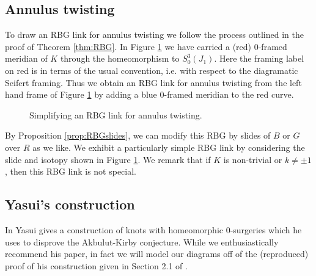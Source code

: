 \documentclass [11pt]{amsart}
\theoremstyle{remark}
\begin{document}
\subsection{Annulus twisting}
\label{sec:annulusRBG}

To draw an RBG link for annulus twisting we follow the process outlined in the proof of Theorem \ref{thm:RBG}. In Figure \ref{fig:rbgforannulus} we have carried a (red) 0-framed meridian of $K$  through the homeomorphism to $S^3_0(J_1)$. Here the framing label on red is in terms of the usual convention, i.e. with respect to the diagramatic Seifert framing. Thus we obtain an RBG link for annulus twisting from the left hand frame of Figure \ref{fig:rbgforannulus} by adding a blue 0-framed meridian to the red curve.

\begin{figure}
{
   \fontsize{9pt}{11pt}\selectfont
   \def\svgwidth{7in}
   
   \vspace*{-5mm}
}
\caption{Simplifying an RBG link for annulus twisting.}
\label{fig:rbgforannulus}
\end{figure}


By Proposition \ref{prop:RBGslides}, we can modify this RBG by slides of $B$ or $G$ over $R$ as we like.  We exhibit a particularly simple RBG link by considering the slide and isotopy shown in Figure \ref{fig:rbgforannulus}. We remark that if $K$ is non-trivial or $k\neq\pm 1$, then this RBG link is not special. 

\subsection{Yasui's construction}\label{sec:Yasui}
In \cite{Yasui} Yasui gives a construction of knots with homeomorphic 0-surgeries which he uses to disprove the Akbulut-Kirby conjecture. While we enthusiastically recommend his paper, in fact we will model our diagrams off of the (reproduced) proof of his construction given in Section 2.1 of \cite{HMP19}. 
\end{document}
